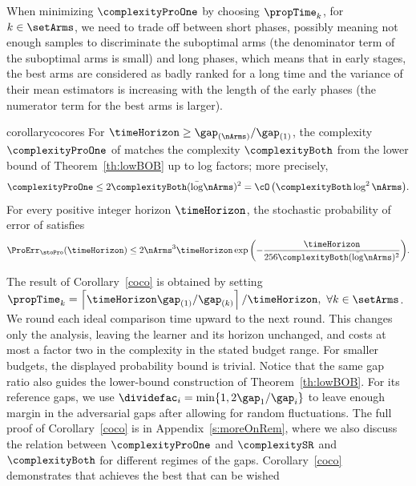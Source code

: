 When minimizing $\complexityProOne$ by choosing $\propTime_k$, for $k\in\setArms$, we need to trade off between
short phases, possibly meaning not enough samples 
to discriminate the suboptimal arms (the denominator term of the suboptimal arms is small) and long phases,
which means that in early stages, the best arms are considered as badly 
ranked for a long time and the variance of their mean estimators is increasing 
with the length of the early phases (the numerator term for the best arms is larger).
%
\begin{restatable}{corollary}{cocores}\label{coco} %
	For $\timeHorizon\geq\gap_{(\nArms)}/\gap_{(1)}$, the complexity
	$\complexityProOne$ of \Pone{} matches the complexity $\complexityBoth$
	from the lower bound of Theorem~\ref{th:lowBOB}
	up to log factors; more precisely,
	\[
	\complexityProOne\leq2\complexityBoth(\bar\log\nArms)^2
	=\cO\left(\complexityBoth\log^2\nArms\right)\!.
	\]
	For every positive integer horizon $\timeHorizon$, the stochastic
	probability of error of \Pone{} satisfies
	\[
	\ProErr_{\stoPro}(\timeHorizon)
	\leq2\nArms^3\timeHorizon\exp\left(
	-\frac{\timeHorizon}{256\complexityBoth(\bar\log\nArms)^2}
	\right)\!.
	\]
\end{restatable}
\noindent The result of Corollary~\ref{coco} is obtained by setting
$\propTime_k=\left\lceil\timeHorizon\gap_{(1)}/\gap_{(k)}\right\rceil/\timeHorizon,$
$\forall k\in\setArms$.
We round each ideal comparison time upward to the next round.
This changes only the analysis, leaving the learner and its horizon
unchanged, and costs at most a factor two in the complexity in the
stated budget range. For smaller budgets, the displayed probability
bound is trivial. Notice that the same gap ratio also guides the lower-bound
construction of Theorem~\ref{th:lowBOB}. For its reference gaps,
we use $\dividefac_i=\min\{1,2\gap_1/\gap_i\}$ to leave enough
margin in the adversarial gaps after allowing for random
fluctuations. The full proof  of Corollary~\ref{coco}
is in Appendix~\ref{s:moreOnRem}, 
where we also discuss the relation between 
$\complexityProOne$ and $\complexitySR$ and 
$\complexityBoth$ for different regimes of the 
gaps.
Corollary~\ref{coco} demonstrates that \Pone{} achieves the best that can be wished 
